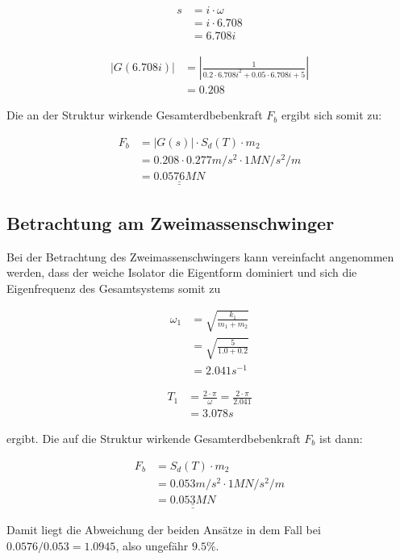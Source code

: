 \begin{align*}
s &= i \cdot \omega\\
  &= i \cdot 6.708\\
  &= 6.708i
\end{align*}

\begin{align*}
|G(6.708i)| &= |\frac{1}{0.2 \cdot 6.708i^2 + 0.05 \cdot 6.708i + 5}|\\
            &= 0.208
\end{align*}

Die an der Struktur wirkende Gesamterdbebenkraft $F_b$ ergibt sich somit zu:

\begin{align*}
F_b &= |G(s)| \cdot S_d(T) \cdot m_2\\
    &= 0.208 \cdot 0.277 m/s^2 \cdot 1 MN/s^2/m\\
    &= \underline{\underline{0.0576 MN}}
\end{align*}

\subsection{Betrachtung am Zweimassenschwinger}

Bei der Betrachtung des Zweimassenschwingers kann vereinfacht angenommen werden, dass der weiche Isolator die Eigentform dominiert \cite{AKK} und sich die Eigenfrequenz des Gesamtsystems somit zu

\begin{align*}
\omega_1 &= \sqrt{\frac{k_1}{m_1 + m_2}}\\
         &= \sqrt{\frac{5}{1.0 + 0.2}}\\
         &= 2.041 s^{-1}
\end{align*}

\begin{align*}
T_1 &= \frac{2 \cdot \pi}{\omega} = \frac{2 \cdot \pi}{2.041}\\
    &= 3.078 s
\end{align*}

ergibt. Die auf die Struktur wirkende Gesamterdbebenkraft $F_b$ ist dann:

\begin{align*}
F_b &= S_d(T) \cdot m_2\\
    &= 0.053 m/s^2 \cdot 1 MN/s^2/m\\
    &= \underline{\underline{0.053 MN}}
\end{align*}

Damit liegt die Abweichung der beiden Ansätze in dem Fall bei $0.0576/0.053=1.0945$, also ungefähr $9.5\%$.

